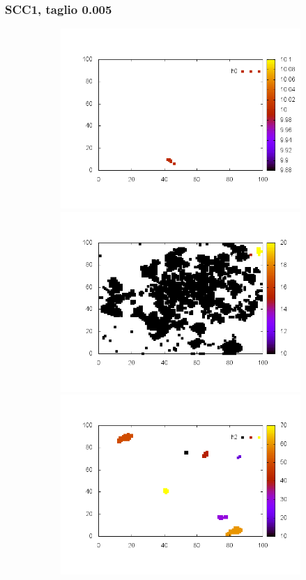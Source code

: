 \documentclass[10pt,a4paper]{article}
\begin{document}
\subsubsection{SCC1, taglio 0.005}
\label{scc1_0-005}
\begin{figure}
\centering

\begin{subfigure}[b]{1\textwidth}
\includegraphics[scale=.3]{./img/stampe/scc1/0.png}
\includegraphics[scale=.3]{./img/stampe/scc1/1.png}
\includegraphics[scale=.3]{./img/stampe/scc1/2.png}

\end{subfigure}
\end{figure}
\end{document}
